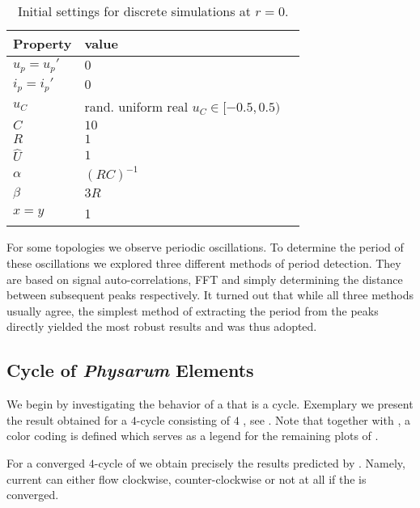	\begin{table}
        \centering
        \begin{tabular}{@{} l *2l @{}}
        \toprule
         \multicolumn{1}{c}{Property}    & value  \\ 
        \midrule
         $u_p = u_p'$ & $0$   \\ 
         $i_p = i_p'$ & $0$   \\ 
         $u_C$ & rand. uniform real $u_C \in [ -0.5 , 0.5 )$   \\ 
         $C$ & $10$ \\
         $R$ & $1$ \\
         $\hat{U}$ & $1$ \\
         $\alpha$ & $(R C)^{-1}$ \\
         $\beta$ & $3 R$ \\
         $x = y$ & 1 \\
        \bottomrule
        \end{tabular}
        \caption[Simulation initial values]{Initial settings for discrete simulations at $r=0$.}
        \label{tab:initialization}
     \end{table}

     For some topologies we observe periodic oscillations. To determine the period of these oscillations we explored three different methods of period detection. They are based on signal auto-correlations, FFT and simply determining the distance between subsequent peaks respectively. It turned out that while all three methods usually agree, the simplest method of extracting the period from the peaks directly yielded the most robust results and was thus adopted.

	\subsection{Cycle of \emph{Physarum} Elements}

		We begin by investigating the behavior of a \Pn that is a cycle. Exemplary we present the result obtained for a $4$-cycle consisting of $4$ \Pes, see . Note that together with , a color coding is defined which serves as a legend for the remaining plots of .

		For a converged $4$-cycle of \Pes we obtain precisely the results predicted by . Namely, current can either flow clockwise, counter-clockwise or not at all if the \Pn is converged. 


